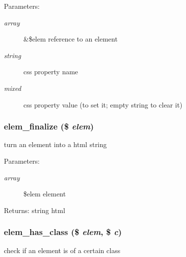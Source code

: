 \begin{Desc}
\item[Parameters:]
\begin{description}
\item[{\em array}]\&\$elem reference to an element \item[{\em string}]css property name \item[{\em mixed}]css property value (to set it; empty string to clear it) \end{description}
\end{Desc}
\hypertarget{html_8inc_8php_f04b43a4dd09e73ca2cef84a4f2e9381}{
\subsubsection[{elem\_\-finalize}]{\setlength{\rightskip}{0pt plus 5cm}elem\_\-finalize (\$ {\em elem})}}
\label{html_8inc_8php_f04b43a4dd09e73ca2cef84a4f2e9381}


turn an element into a html string

\begin{Desc}
\item[Parameters:]
\begin{description}
\item[{\em array}]\$elem element \end{description}
\end{Desc}
\begin{Desc}
\item[Returns:]string html \end{Desc}
\hypertarget{html_8inc_8php_b1019c4b75181c1c1af10e1c1e5e197d}{
\subsubsection[{elem\_\-has\_\-class}]{\setlength{\rightskip}{0pt plus 5cm}elem\_\-has\_\-class (\$ {\em elem}, \/  \$ {\em c})}}
\label{html_8inc_8php_b1019c4b75181c1c1af10e1c1e5e197d}


check if an element is of a certain class

